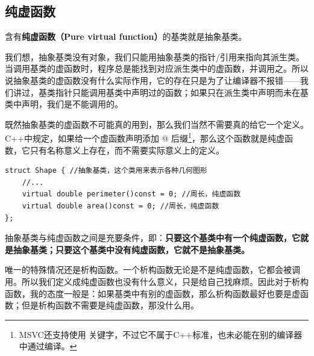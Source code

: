 \subsection*{纯虚函数}
含有\textbf{纯虚函数（Pure virtual function）}的基类就是抽象基类。\par
我们想，抽象基类没有对象，我们只能用抽象基类的指针/引用来指向其派生类。当调用基类的虚函数时，程序总是能找到对应派生类中的虚函数，并调用之。所以说抽象基类的虚函数没有什么实际作用，它的存在只是为了让编译器不报错——我们讲过，基类指针只能调用基类中声明过的函数；如果只在派生类中声明而未在基类中声明，我们是不能调用的。\par
既然抽象基类的虚函数不可能真的用到，那么我们当然不需要真的给它一个定义。C++中规定，如果给一个虚函数声明添加 @ 后缀\footnote{MSVC还支持使用 \lstinline@abstract@ 关键字，不过它不属于C++标准，也未必能在别的编译器中通过编译。}，那么这个函数就是纯虚函数，它只有名称意义上存在，而不需要实际意义上的定义。
\begin{lstlisting}
struct Shape { //抽象基类，这个类用来表示各种几何图形
    //...
    virtual double perimeter()const = 0; //周长，纯虚函数
    virtual double area()const = 0; //周长，纯虚函数
};
\end{lstlisting}
抽象基类与纯虚函数之间是充要条件，即：\textbf{只要这个基类中有一个纯虚函数，它就是抽象基类；只要这个基类中没有纯虚函数，它就不是抽象基类。}\par
唯一的特殊情况还是析构函数。一个析构函数无论是不是纯虚函数，它都会被调用。所以我们定义成纯虚函数也没有什么意义，只是给自己找麻烦。因此对于析构函数，我的态度一般是：如果基类中有别的虚函数，那么析构函数最好也要是虚函数；但是析构函数不需要是纯虚函数，那没什么用。\par
